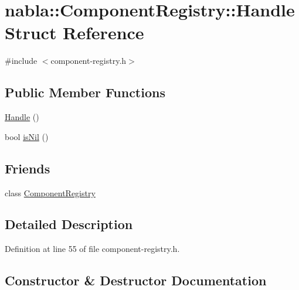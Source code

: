 \hypertarget{structnabla_1_1_component_registry_1_1_handle}{}\section{nabla\+::Component\+Registry\+::Handle Struct Reference}
\label{structnabla_1_1_component_registry_1_1_handle}


{\ttfamily \#include $<$component-\/registry.\+h$>$}

\subsection*{Public Member Functions}
\begin{DoxyCompactItemize}
\item 
\mbox{\hyperlink{structnabla_1_1_component_registry_1_1_handle_a9741e1e8ceb984fa1f5d1eec5d0ee21c}{Handle}} ()
\item 
bool \mbox{\hyperlink{structnabla_1_1_component_registry_1_1_handle_a4d8a1b938a0dea3d7a07d5b5476ec64f}{is\+Nil}} ()
\end{DoxyCompactItemize}
\subsection*{Friends}
\begin{DoxyCompactItemize}
\item 
class \mbox{\hyperlink{structnabla_1_1_component_registry_1_1_handle_a1da30f92d011625cd9eed0403ad64dbf}{Component\+Registry}}
\end{DoxyCompactItemize}


\subsection{Detailed Description}


Definition at line 55 of file component-\/registry.\+h.



\subsection{Constructor \& Destructor Documentation}
\mbox{\label{structnabla_1_1_component_registry_1_1_handle_a9741e1e8ceb984fa1f5d1eec5d0ee21c}} 
